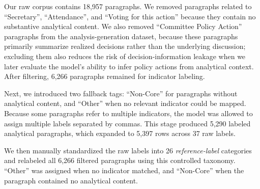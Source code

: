 Our raw corpus contains 18,957 paragraphs. We removed paragraphs related to ``Secretary'', ``Attendance'', and ``Voting for this action'' because they contain no substantive analytical content. We also removed ``Committee Policy Action'' paragraphs from the analysis-generation dataset, because these paragraphs primarily summarize realized decisions rather than the underlying discussion; excluding them also reduces the risk of decision-information leakage when we later evaluate the model’s ability to infer policy actions from analytical context. After filtering, 6,266 paragraphs remained for indicator labeling.


Next, we introduced two fallback tags: ``Non-Core'' for paragraphs without analytical content, and ``Other'' when no relevant indicator could be mapped. Because some paragraphs refer to multiple indicators, the model was allowed to assign multiple labels separated by commas. This stage produced 5,290 labeled analytical paragraphs, which expanded to 5,397 rows across 37 raw labels.


We then manually standardized the raw labels into 26 \textit{reference-label} categories and relabeled all 6,266 filtered paragraphs using this controlled taxonomy. ``Other'' was assigned when no indicator matched, and ``Non-Core'' when the paragraph contained no analytical content.



